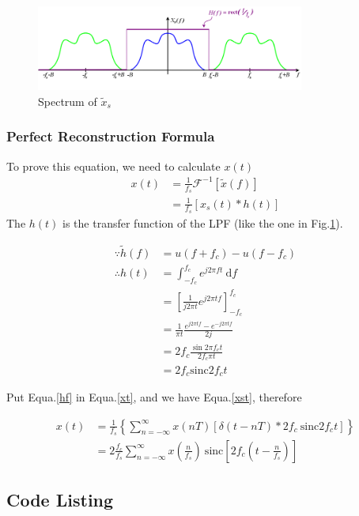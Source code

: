 \documentclass{article}
\begin{document}
\begin{figure}[htbp]
    \centering
    \includegraphics[keepaspectratio,width=250pt]{sampling.png}
    \caption{Spectrum of $\widetilde{x}_s$}\label{sampling}
\end{figure}

\subsubsection*{Perfect Reconstruction Formula}

To prove this equation, we need to calculate $x(t)$
\begin{align}
    x(t) &= \frac{1}{f_s} \mathcal{F}^{-1} \left[ \widetilde{x}(f) \right] \nonumber \\
    &= \frac{1}{f_s} \left[ x_s(t) * h(t) \right] \label{xt}
\end{align}
The $h(t)$ is the transfer function of the LPF (like the one in Fig.\ref{sampling}).

\begin{align}
    \because \widetilde{h}(f) &= u(f + f_c) - u(f - f_c)\nonumber \\
    \therefore h(t) &= \int_{-f_c}^{f_c} e^{j2 \pi ft} ~ \mathrm{d}f \nonumber\\
    &= \left[ \frac{1}{j2 \pi t} e^{j2 \pi t f} \right]_{-f_c }^{f_c}\nonumber \\
    &= \frac{1}{\pi t} \frac{e^{j2 \pi t f} - e^{- j2 \pi t f}}{2j}\nonumber \\
    &= 2f_c \frac{\sin 2\pi f_c t}{2f_c \pi t} \nonumber \\
    &= 2f_c \mathrm{sinc} 2f_c t \label{hf}
\end{align}

Put Equa.\ref{hf} in Equa.\ref{xt}, and we have Equa.\ref{xst}, therefore

\begin{align}
    x(t) &= \frac{1}{f_s} \left\{ \sum_{n = -\infty}^{\infty} x(nT) \left[ \delta(t - nT) * 2f_c ~ \mathrm{sinc} 2f_c t \right] \right\}\nonumber \\
    &= 2 \frac{f_c}{f_s} \sum_{n = -\infty}^{\infty}  x(\frac{n}{f_s}) ~ \mathrm{sinc}\left[ 2f_c(t - \frac{n}{f_s}) \right]
\end{align}



% 
% 

\begin{appendices}
    \section{Code Listing}

\end{appendices}
\end{document}
